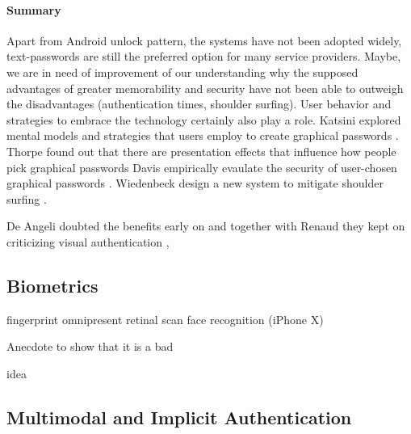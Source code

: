 	\paragraph{Summary}
	Apart from Android unlock pattern, the systems have not been adopted widely, text-passwords are still the preferred option for many service providers. Maybe, we are in need of improvement of our understanding why the supposed advantages of greater memorability and security have not been able to outweigh the disadvantages (authentication times, shoulder surfing). User behavior and strategies to embrace the technology certainly also play a role.
Katsini \etal explored mental models and strategies that users employ to create graphical passwords
\cite{Katsini2017StrategiesGraphicalPasswords}.
Thorpe \etal found out that there are presentation effects that influence how people pick graphical passwords \cite{Thorpe2014PresentationEffects}
Davis \etal empirically evaulate the security of user-chosen graphical passwords \cite{Davis2004UserChoiceGraphical}. Wiedenbeck \etal design a new system to mitigate shoulder surfing \cite{Wiedenbeck2006ConvexHull}. 

\cite{Zezschwitz2013PatternsInTheWild}


De Angeli \etal doubted the benefits early on \cite{DeAngeli2005PictureThousandWords}  and together with Renaud they kept on criticizing visual authentication \cite{Renaud2009VisualSnakeOil}, 

	\subsection{Biometrics}
	
	\cite{Jakobsson2014HowToWearYourPW,DeLuca2012TouchMeOnce,Peisert2013PriciplesAuthentication,Rybnicek2014RoadmapContinuousAuth}
	
	
	fingerprint omnipresent 
	retinal scan
	face recognition (iPhone X)
	
	
	Anecdote to show that it is a bad
	 
	 idea  
	
	\subsection{Multimodal and Implicit Authentication}
	
